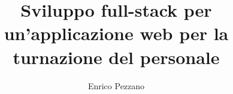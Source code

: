 \title{Sviluppo full-stack per un'applicazione web per la turnazione del personale}
\makeatletter\let\Title\@title\makeatother

\author{Enrico Pezzano}


